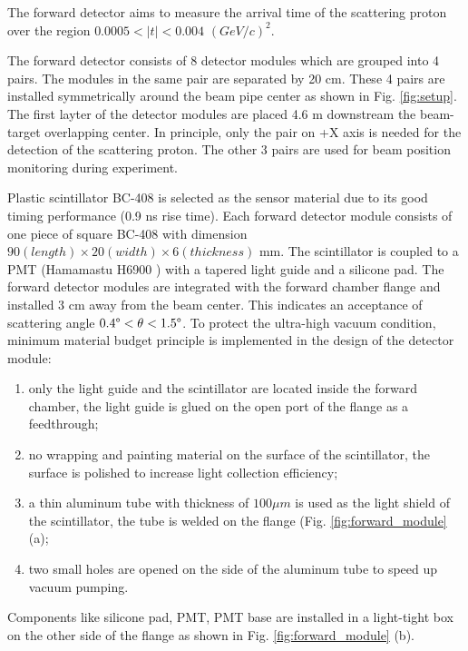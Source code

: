 \documentclass[number]{elsarticle}
\begin{document}
The forward detector aims to measure the arrival time of the scattering proton over the region \(0.0005 < |t| < 0.004\) \((GeV/c)^2\).

The forward detector consists of 8 detector modules which are grouped into 4 pairs. The modules in the same pair are separated by 20 cm.
These 4 pairs are installed symmetrically around the beam pipe center as shown in Fig. \ref{fig:setup}.
The first layter of the detector modules are placed 4.6 m downstream the beam-target overlapping center.
In principle, only the pair on +X axis is needed for the detection of the scattering proton. 
The other 3 pairs are used for beam position monitoring during experiment.

Plastic scintillator BC-408 \cite{bc408} is selected as the sensor material due to its good timing performance (0.9 ns rise time).
Each forward detector module consists of one piece of square BC-408 with dimension \(90 (length) \times 20 (width) \times 6 (thickness)\) mm.
The scintillator is coupled to a PMT (Hamamastu H6900 \cite{hamamatsu}) with a tapered light guide and a silicone pad.
The forward detector modules are integrated with the forward chamber flange and  installed 3 cm away from the beam center.
This indicates an acceptance of scattering angle \(0.4\degree < \theta < 1.5\degree\).
To protect the ultra-high vacuum condition, minimum material budget principle is implemented in the design of the detector module:
\begin{enumerate}
\item only the light guide and the scintillator are located inside the forward chamber, the light guide is glued on the open port of the flange as a feedthrough;
\item no wrapping and painting material on the surface of the scintillator, the surface is polished to increase light collection efficiency;
\item a thin aluminum tube with thickness of \(100 \mu m\) is used as the light shield of the scintillator, the tube is welded on the flange (Fig. \ref{fig:forward_module} (a);
\item two small holes are opened on the side of the aluminum tube to speed up vacuum pumping.
\end{enumerate}
Components like silicone pad, PMT, PMT base are installed in a light-tight box on the other side of the flange as shown in Fig. \ref{fig:forward_module} (b).
\end{document}
